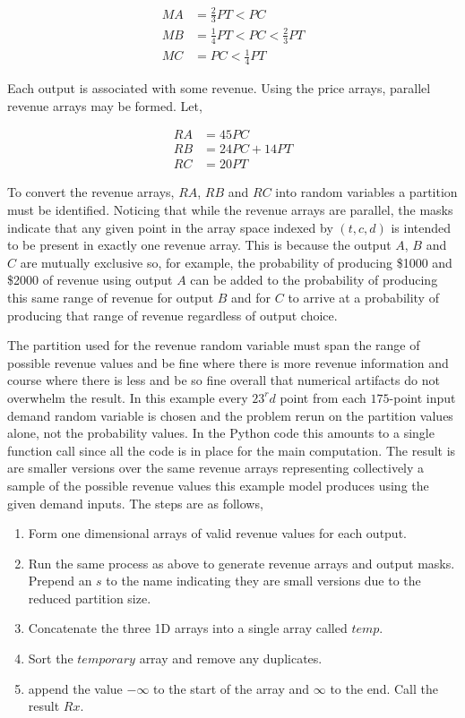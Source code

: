 \begin{align*}
MA &= \frac{2}{3}PT < PC\\
MB &= \frac{1}{4}PT < PC < \frac{2}{3}PT\\
MC &= PC < \frac{1}{4}PT
\end{align*}

Each output is associated with some revenue. Using the price arrays, parallel revenue arrays may be formed. Let,

\begin{align*}
RA &= 45PC\\
RB &= 24PC + 14PT\\
RC &= 20PT
\end{align*}

To convert  the revenue arrays, $RA$, $RB$ and $RC$ into random variables a partition must be identified. Noticing that while the revenue arrays are parallel, the masks indicate that any given point in the array space indexed by $(t,c,d)$ is intended to be present in exactly one revenue array. This is because the output $A$, $B$ and $C$ are mutually exclusive so, for example, the probability of producing \$1000 and \$2000 of revenue using output $A$ can be added to the probability of producing this same range of revenue for output $B$ and for $C$ to arrive at a probability of producing that range of revenue regardless of output choice. 

The partition used for the revenue random variable must span the range of possible revenue values and be fine where there is more revenue information and course where there is less and be so fine overall that numerical artifacts do not overwhelm the result. In this example every $23^rd$ point from each $175$-point input demand random variable is chosen and the problem rerun on the partition values alone, not the probability values. In the Python code this amounts to a single function call since all the code is in place for the main computation. The result is are smaller versions over the same revenue arrays representing collectively a sample of the possible revenue values this example model produces using the given demand inputs. The steps are as follows,

\begin{enumerate}
\item Form one dimensional arrays of valid revenue values for each output.
\item Run the same process as above to generate revenue arrays and output masks. Prepend an $s$ to the name indicating they are small versions due to the reduced partition size.
\item Concatenate the three 1D arrays into a single array called $temp$.
\item Sort the $temporary$ array and remove any duplicates.
\item append the value $-\infty$ to the start of the array and $\infty$ to the end. Call the result $Rx$.
\end{enumerate}

